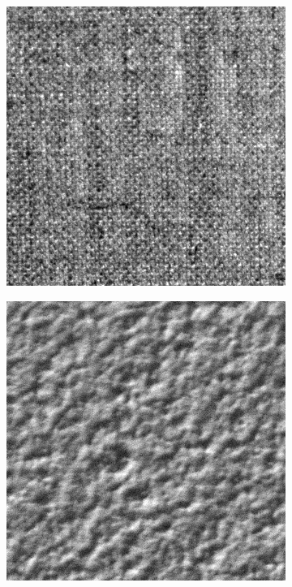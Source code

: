 \begin{figure}[H]
\begin{subfigure}{.15\textwidth}
  \includegraphics[width=.8\linewidth]{kylberg_examples/canvas1_003.png}
\end{subfigure}
\begin{subfigure}{.15\textwidth}
  \centering
  \includegraphics[width=.8\linewidth]{kylberg_examples/ceiling1_003.png}
\end{subfigure}%
\begin{subfigure}{.15\textwidth}
  \centering

\end{subfigure}
\end{figure}
